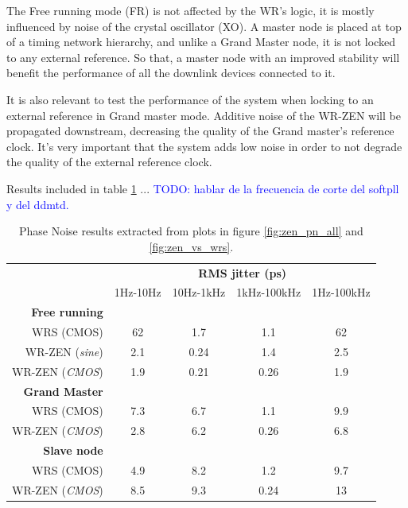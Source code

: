 The Free running mode (FR) is not affected by the WR's logic, it is mostly influenced by noise of the crystal oscillator (XO). A master node is placed at top of a timing network hierarchy, and unlike a Grand Master node, it is not locked to any external reference. So that, a master node with an improved stability will benefit the performance of all the downlink devices connected to it.

It is also relevant to test the performance of the system when locking to an external reference in Grand master mode. Additive noise of the WR-ZEN will be propagated downstream, decreasing the quality of the Grand master's reference clock. It's very important that the system adds low noise in order to not degrade the quality of the external reference clock.

Results included in table \ref{tab:pn_results} ... \textcolor{blue}{TODO: hablar de la frecuencia de corte del softpll y del ddmtd.}
    
\begin{table}\centering
     \begin{tabular}{@{} rcccc@{}}%
         & \multicolumn{4}{c}{\bfseries{RMS jitter (ps)}} \\
         \cmidrule(l){2-5}
         & 1Hz-10Hz & 10Hz-1kHz & 1kHz-100kHz  & 1Hz-100kHz \\ \midrule
         \textbf{Free running}\\
         \small{WRS (CMOS)}             & 62  & 1.7  & 1.1  & 62  \\
         \small{WR-ZEN (\textit{sine})} & 2.1 & 0.24 & 1.4  & 2.5 \\
         \small{WR-ZEN (\textit{CMOS})} & 1.9 & 0.21 & 0.26 & 1.9 \\
         \cmidrule(l){2-5}
         
         \textbf{Grand Master}\\
         \small{WRS (CMOS)}             & 7.3 & 6.7 & 1.1 & 9.9\\
         \small{WR-ZEN (\textit{CMOS})} & 2.8 & 6.2 & 0.26 & 6.8\\
         \cmidrule(l){2-5}
         
         \textbf{Slave node}\\
         \small{WRS (CMOS)}             & 4.9 & 8.2 & 1.2  & 9.7\\
         \small{WR-ZEN (\textit{CMOS})} & 8.5 & 9.3 & 0.24 & 13\\
         
         \bottomrule
        \end{tabular}
        \caption{Phase Noise results extracted from plots in figure \ref{fig:zen_pn_all} and \ref{fig:zen_vs_wrs}.}
        \label{tab:pn_results}
\end{table}

